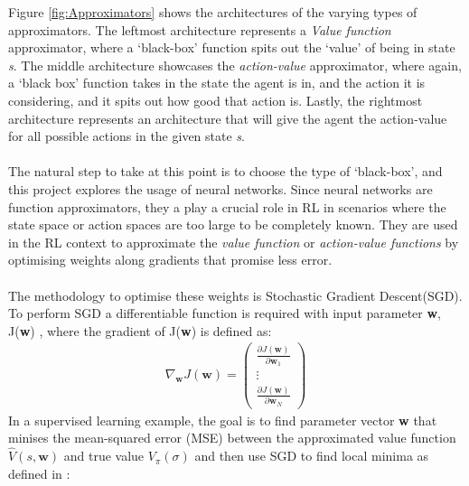 \documentclass[ %
                    author={Ashwinder Khurana},
                supervisor={Prof Dave Cliff},
                    degree={MEng},
                     title={The Deeply Reinforced Trader},
                  subtitle={},
                      type={enterprise},
                      year={2020} ]{dissertation}
\def\gradient{
\begin{pmatrix}
    \frac{\partial J(\textbf{w})}{\partial\textbf{w}_1} \\
    \vdots \\
     \frac{\partial J(\textbf{w})}{\partial\textbf{w}_N}
\end{pmatrix}}
\begin{document}
{\begin{figure}[H]
\end{figure}

\noindent
Figure \ref{fig:Approximators} shows the architectures of the varying types of approximators. The leftmost architecture represents a \textit{Value function} approximator, where a \enquote*{black-box} function spits out the \enquote*{value} of being in state \textit{s}. The middle architecture showcases the \textit{action-value} approximator, where again, a \enquote*{black box} function takes in the state the agent is in, and the action it is considering, and it spits out how good that action is. Lastly, the rightmost architecture represents an architecture that will give the agent the action-value for all possible actions in the given state \textit{s}. 
\\
\\
The natural step to take at this point is to choose the type of \enquote*{black-box}, and this project explores the usage of neural networks. Since neural networks are function approximators, they a play a crucial role in RL in scenarios where the state space or action spaces are too large to be completely known. They are used in the RL context to approximate the \textit{value function} or \textit{action-value functions} by optimising weights along gradients that promise less error. 
\\
\\
The methodology to optimise these weights is Stochastic Gradient Descent(SGD). To perform SGD a differentiable function is required with input parameter \textbf{w}, J(\textbf{w}) , where the gradient of J(\textbf{w}) is defined as:
\begin{equation}
\label{parameter-gradient}
\begin{split}
\nabla_\textbf{w} J(\textbf{w}) = \gradient
\end{split}
\end{equation}
In a supervised learning example, the goal is to find parameter vector \textbf{w} that minises the mean-squared error (MSE) between the approximated value function $\hat{V}(s, \textbf{w})$ and true value $V_\pi(\sigma)$ and then use SGD to find local minima as defined in \cite{https://www.davidsilver.uk/wp-content/uploads/2020/03/FA.pdf}:

}
\end{document}
